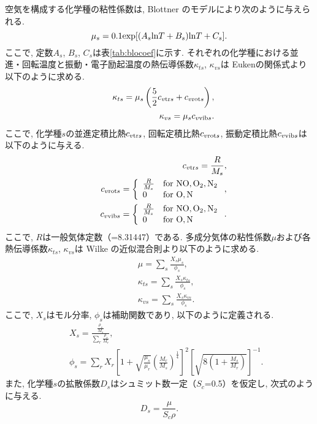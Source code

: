 空気を構成する化学種の粘性係数は,
Blottner のモデル\cite{blottner}により次のように与えられる.
\begin{equation}
\mu_s=0.1{\rm exp}[(A_s{\rm ln}T+B_s){\rm ln}T+C_s].
\end{equation}
ここで,
定数$A_s$, $B_s$, $C_s$は表\ref{tab:blocoef}に示す.
それぞれの化学種における並進・回転温度と振動・電子励起温度の熱伝導係数$\kappa_{ts}$, $\kappa_{vs}$は Euken\cite{euken}の関係式より以下のように求める.
\begin{eqnarray}
&& \kappa_{ts}=\mu_s \left( \frac{5}{2} c_{v{\rm tr}s}+c_{v{\rm rot}s} \right), \\
&& \kappa_{vs}=\mu_s c_{v{\rm vib}s}.
\end{eqnarray}
ここで,
化学種$s$の並進定積比熱$c_{v{\rm tr}s}$,
回転定積比熱$c_{v{\rm rot}s}$,
振動定積比熱$c_{v{\rm vib}s}$は以下のように与える.
\begin{eqnarray}
&& c_{v{\rm tr}s}=\frac{R}{M_s},\\
&& c_{v{\rm rot}s}=\left\{ 
                   \begin{array}{ll}
                      \frac{R}{M_s} & {\rm for~ NO,O_2,N_2}         \\
                      0 & {\rm for~ O,N}       
                   \end{array} \right.,\\
&& c_{v{\rm vib}s}=\left\{ \begin{array}{ll}
                      \frac{R}{M_s} & {\rm for~ NO,O_2,N_2}         \\
                      0 & {\rm for~ O,N}       
              \end{array} \right..
\end{eqnarray}
ここで,
$R$は一般気体定数（=8.31447）である.
多成分気体の粘性係数$\mu$および各熱伝導係数$\kappa_{ts}$, $\kappa_{vs}$は Wilke の近似混合則\cite{wilke}より以下のように求める.
\begin{eqnarray}
&&\mu=\sum_{s}\frac{X_{s}\mu_{s}}{\phi_{s}},\\
&&\kappa_{ts}=\sum_{s}\frac{X_{s}\kappa_{ts}}{\phi_{s}},\\
&&\kappa_{vs}=\sum_{s}\frac{X_{s}\kappa_{vs}}{\phi_{s}}.
\end{eqnarray}
ここで,
$X_s$はモル分率,
$\phi_s$は補助関数であり,
以下のように定義される.
\begin{eqnarray}
&&X_s=\frac{\frac{\rho_s}{M_s}}{\sum_{r}\frac{\rho_r}{M_r}} ,\\
&&\phi_s=\sum_{r}X_r \left[ 1+\sqrt{\frac{\mu_s}{\mu_r}} \left( \frac{M_r}{M_s} \right )^{\frac{1}{4}} \right]^2 \left[ \sqrt{8 \left( 1+ \frac{M_s}{M_r}\right)} \right]^{-1}.
\end{eqnarray}
また,
化学種$s$の拡散係数$D_s$はシュミット数一定（$S_c$=0.5）を仮定し,
次式のように与える.
\begin{equation}
D_s=\frac{\mu}{S_{c}\rho}.
\end{equation}

